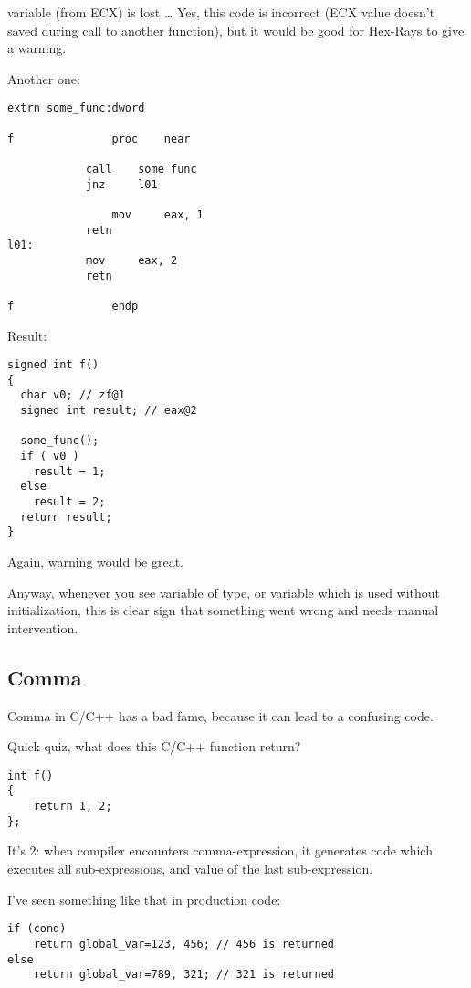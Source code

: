  variable (from ECX) is lost \dots
Yes, this code is incorrect (ECX value doesn't saved during call to another function),
but it would be good for Hex-Rays to give a warning.

Another one:

\begin{lstlisting}
extrn some_func:dword

f               proc    near

	        call    some_func
        	jnz     l01

                mov     eax, 1
	        retn
l01:
	        mov     eax, 2
        	retn

f               endp
\end{lstlisting}

Result:

\begin{lstlisting}
signed int f()
{
  char v0; // zf@1
  signed int result; // eax@2

  some_func();
  if ( v0 )
    result = 1;
  else
    result = 2;
  return result;
}
\end{lstlisting}

Again, warning would be great.

Anyway, whenever you see variable of  type, or variable which is used without initialization, this is clear sign
that something went wrong and needs manual intervention.

\subsection{Comma}

Comma in C/C++ has a bad fame, because it can lead to a confusing code.

Quick quiz, what does this C/C++ function return?

\begin{lstlisting}
int f()
{
	return 1, 2;
};
\end{lstlisting}

It's 2: when compiler encounters comma-expression, it generates code which executes all sub-expressions, and
 value of the last sub-expression.

I've seen something like that in production code:

\begin{lstlisting}
if (cond)
	return global_var=123, 456; // 456 is returned
else
	return global_var=789, 321; // 321 is returned
\end{lstlisting}

